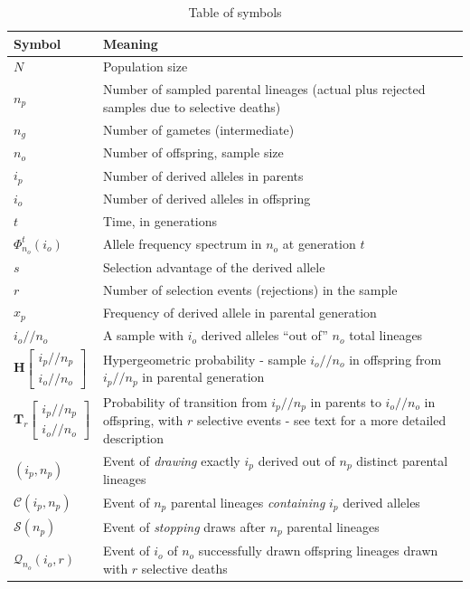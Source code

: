 \documentclass[review]{elsarticle}
\newcommand{\dslash}{/\!\!/}
\newcommand{\Coalc}[4]{\begin{bmatrix}#1\dslash #2 \\ #3\dslash #4 \end{bmatrix}}
\begin{document}
\begin{table}
  \centering
  \begin{tabular}{l|p{100mm}}
    Symbol & Meaning\\
    \hline
    $N$ & Population size\\
    $n_p$ & Number of sampled parental lineages (actual plus rejected samples due to selective deaths)\\
    $n_g$ & Number of gametes (intermediate)\\
    $n_o$ & Number of offspring, sample size\\
    $i_p$ & Number of derived alleles in parents\\
    $i_o$ & Number of derived alleles in offspring\\
    $t$ & Time, in generations\\
    $\Phi_{n_o}^{t}(i_o)$ & Allele frequency spectrum in $n_o$ at generation $t$\\
    $s$ & Selection advantage of the derived allele\\
    $r$ & Number of selection events (rejections) in the sample\\
    $x_p$ & Frequency of derived allele in parental generation\\
    $i_o \dslash n_o$ & A sample with $i_o$ derived alleles ``out of'' $n_o$ total lineages\\
    $\mathbf{H}\Coalc{i_p}{n_p}{i_o}{n_o}$ & Hypergeometric probability -
                                             sample $i_o \dslash n_o$ in offspring from $i_p \dslash n_p$ in parental generation\\
    $\mathbf{T}_{r}\Coalc{i_p}{n_p}{i_o}{n_o}$ & Probability of transition from $i_p \dslash n_p$ in parents
                                                 to $i_o \dslash n_o$ in offspring, with $r$ selective events -
                                                 see text for a more detailed description\\
    \hline
    $(i_p, n_p)$ & Event of \textit{drawing} exactly $i_p$ derived out of $n_p$ distinct parental lineages \\
    $\mathcal{C}(i_p, n_p)$ & Event of $n_p$ parental lineages \textit{containing} $i_p$ derived alleles \\
    $\mathcal{S}(n_p)$ & Event of \textit{stopping} draws after $n_p$ parental lineages \\
    $\mathcal{Q}_{n_o}(i_o, r)$ & Event of $i_o$ of $n_o$ successfully drawn offspring lineages drawn with $r$ selective deaths\\
  \end{tabular}
  \caption{\label{tab_symbols} Table of symbols}
\end{table}
\end{document}
